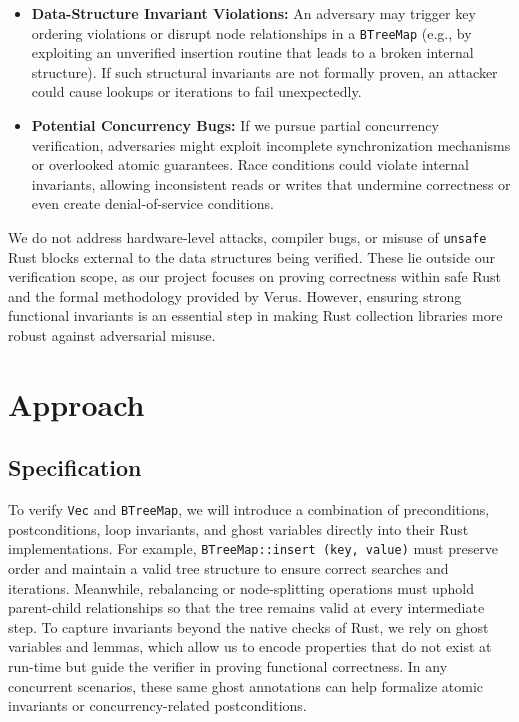 \documentclass[conference]{IEEEtran}
\begin{document}
\begin{itemize}
\item \textbf{Data-Structure Invariant Violations:} An adversary may trigger key ordering violations or disrupt node relationships in a \texttt{BTreeMap} (e.g., by exploiting an unverified insertion routine that leads to a broken internal structure). If such structural invariants are not formally proven, an attacker could cause lookups or iterations to fail unexpectedly.
\item \textbf{Potential Concurrency Bugs:} If we pursue partial concurrency verification, adversaries might exploit incomplete synchronization mechanisms or overlooked atomic guarantees. Race conditions could violate internal invariants, allowing inconsistent reads or writes that undermine correctness or even create denial-of-service conditions.
\end{itemize}

We do not address hardware-level attacks, compiler bugs, or misuse of \texttt{unsafe} Rust blocks external to the data structures being verified. These lie outside our verification scope, as our project focuses on proving correctness within safe Rust and the formal methodology provided by Verus. However, ensuring strong functional invariants is an essential step in making Rust collection libraries more robust against adversarial misuse.

\section{Approach}

\subsection{Specification}
To verify \texttt{Vec} and \texttt{BTreeMap}, we will introduce a combination of preconditions, postconditions, loop invariants, and ghost variables directly into their Rust implementations. For example, \texttt{BTreeMap::insert (key, value)} must preserve order and maintain a valid tree structure to ensure correct searches and iterations. Meanwhile, rebalancing or node-splitting operations must uphold parent-child relationships so that the tree remains valid at every intermediate step. To capture invariants beyond the native checks of Rust, we rely on ghost variables and lemmas, which allow us to encode properties that do not exist at run-time but guide the verifier in proving functional correctness. In any concurrent scenarios, these same ghost annotations can help formalize atomic invariants or concurrency-related postconditions.
\end{document}
